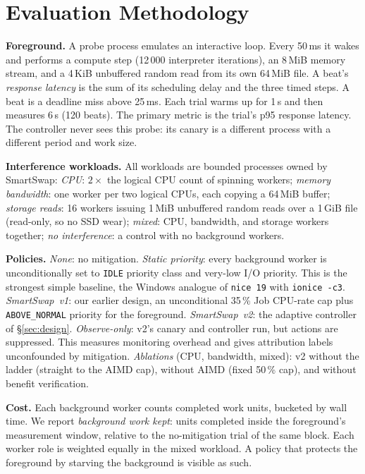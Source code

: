 \section{Evaluation Methodology}
\label{sec:method}

\textbf{Foreground.} A probe process emulates an interactive loop. Every 50\,ms it wakes and performs a compute step (12\,000 interpreter iterations), an 8\,MiB memory stream, and a 4\,KiB unbuffered random read from its own 64\,MiB file. A beat's \emph{response latency} is the sum of its scheduling delay and the three timed steps. A beat is a deadline miss above 25\,ms. Each trial warms up for 1\,s and then measures 6\,s (120 beats). The primary metric is the trial's p95 response latency. The controller never sees this probe: its canary is a different process with a different period and work size.

\textbf{Interference workloads.} All workloads are bounded processes owned by SmartSwap:
\emph{CPU}: $2\times$ the logical CPU count of spinning workers;
\emph{memory bandwidth}: one worker per two logical CPUs, each copying a 64\,MiB buffer;
\emph{storage reads}: 16 workers issuing 1\,MiB unbuffered random reads over a 1\,GiB file (read-only, so no SSD wear);
\emph{mixed}: CPU, bandwidth, and storage workers together;
\emph{no interference}: a control with no background workers.

\textbf{Policies.}
\emph{None}: no mitigation.
\emph{Static priority}: every background worker is unconditionally set to \texttt{IDLE} priority class and very-low I/O priority. This is the strongest simple baseline, the Windows analogue of \texttt{nice 19} with \texttt{ionice -c3}.
\emph{SmartSwap~v1}: our earlier design, an unconditional 35\,\% Job CPU-rate cap plus \texttt{ABOVE\_NORMAL} priority for the foreground.
\emph{SmartSwap~v2}: the adaptive controller of \S\ref{sec:design}.
\emph{Observe-only}: v2's canary and controller run, but actions are suppressed. This measures monitoring overhead and gives attribution labels unconfounded by mitigation.
\emph{Ablations} (CPU, bandwidth, mixed): v2 without the ladder (straight to the AIMD cap), without AIMD (fixed 50\,\% cap), and without benefit verification.

\textbf{Cost.} Each background worker counts completed work units, bucketed by wall time. We report \emph{background work kept}: units completed inside the foreground's measurement window, relative to the no-mitigation trial of the same block. Each worker role is weighted equally in the mixed workload. A policy that protects the foreground by starving the background is visible as such.

